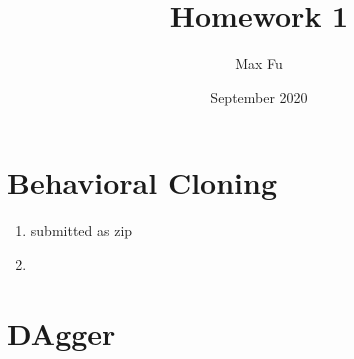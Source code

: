 \documentclass{article}
\title{Homework 1}
\author{Max Fu}
\date{September 2020}
\begin{document}
\maketitle

\section{Behavioral Cloning}
\begin{enumerate}
    \item submitted as zip
    \item 
\end{enumerate}

\section{DAgger}
\end{document}
